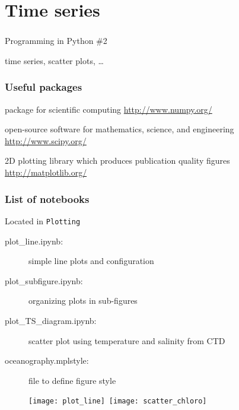 \section{Time series}

{
\begin{frame}
\frametitle{}
{\fontsize{40}{50}\selectfont Programming in Python \#2} 

{\huge time series, scatter plots, \ldots} 

\end{frame}
}

\begin{frame}
\frametitle{Useful packages}

\begin{description}
\item<1->[NumPy:] package for scientific computing \url{http://www.numpy.org/}
\item<1->[SciPy:] open-source software for mathematics, science, and engineering \url{http://www.scipy.org/}
\item<2->[matplotlib:] 2D plotting library which produces publication quality figures \url{http://matplotlib.org/}
\end{description}
\end{frame}


\begin{frame}[c, fragile]
\frametitle{List of notebooks}

Located in \verb|Plotting|

{\scriptsize
\begin{description}
\item[plot\_line.ipynb:] simple line plots and configuration
\item[plot\_subfigure.ipynb:] organizing plots in sub-figures
\item[plot\_TS\_diagram.ipynb:] scatter plot using temperature and salinity from CTD
\item[]
\item[oceanography.mplstyle:] file to define figure style  

\end{description}
}

\begin{figure}
\texttt{[image: plot\_line]}~\texttt{[image: scatter\_chloro]}
\end{figure}

\end{frame}

